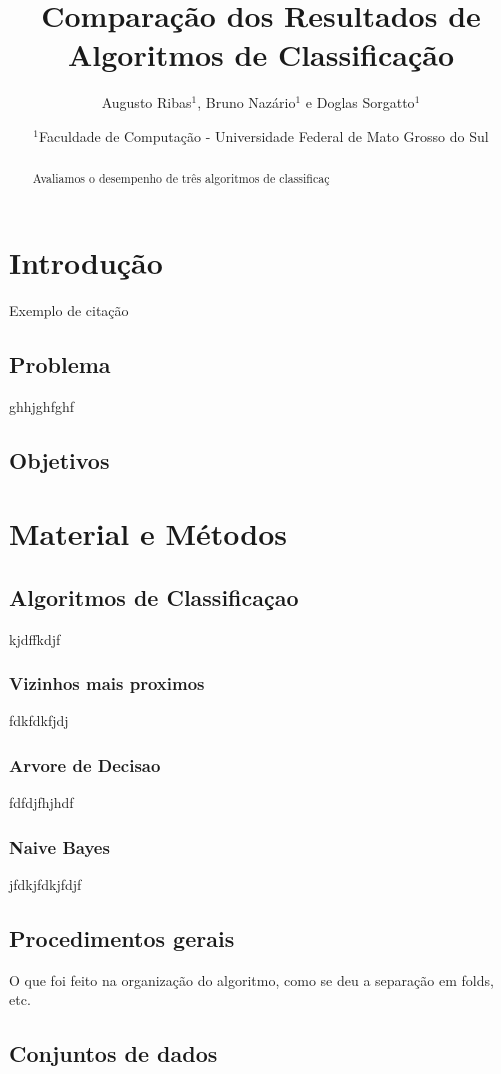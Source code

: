 \documentclass[12pt, a4paper, brazil]{article}
\title{Comparação dos Resultados de Algoritmos de Classificação}
\author{Augusto Ribas$^1$, Bruno Nazário$^1$ e Doglas Sorgatto$^1$}
\date{$^1$Faculdade de Computação - Universidade Federal de Mato Grosso do Sul}
\begin{document}
\maketitle

\begin{abstract}
Avaliamos o desempenho de três algoritmos de classificaç
\end{abstract}
%
\section{Introdução}

Exemplo de citação  \citep{Mitchell1997}

\subsection{Problema	}
ghhjghfghf

\subsection{Objetivos}

\section{Material e Métodos}

\subsection{Algoritmos de Classificaçao}
kjdffkdjf
\subsubsection{Vizinhos mais proximos}
fdkfdkfjdj
\subsubsection{Arvore de Decisao}
fdfdjfhjhdf
\subsubsection{Naive Bayes}
jfdkjfdkjfdjf

\subsection{Procedimentos gerais}
O que foi feito na organização do algoritmo, como se deu a separação em folds, etc.

\subsection{Conjuntos de dados}
\end{document}
